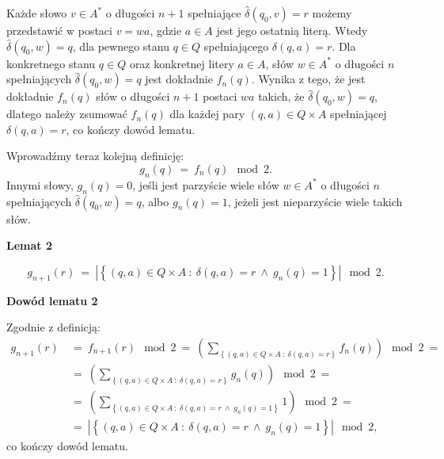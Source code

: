 \documentclass[12pt]{article}
\begin{document}
	Każde słowo \(v \in A^{\ast}\) o długości \(n + 1\) spełniające
	\(\hat{\delta} \left( q_0, v \right) = r\) możemy przedstawić w postaci \(v
	= wa\), gdzie \(a \in A\) jest jego ostatnią literą. Wtedy \(\hat{\delta}
	\left( q_0, w \right) = q\), dla pewnego stanu \(q \in Q\) spełniającego
	\(\delta (q, a) = r\). Dla konkretnego stanu \(q \in Q\) oraz konkretnej
	litery \(a \in A\), słów \(w \in A^{\ast}\) o długości \(n\) spełniających
	\(\hat{\delta} \left( q_0, w \right) = q\) jest dokładnie \(f_{n} (q)\).
	Wynika z tego, że jest dokładnie \(f_{n} (q)\) słów o długości \(n + 1\)
	postaci \(wa\) takich, że \(\hat{\delta} \left( q_0, w \right) = q\),
	dlatego należy zsumować \(f_{n} (q)\) dla każdej pary \((q, a) \in Q \times
	A\) spełniającej \(\delta (q, a) = r\), co kończy dowód lematu.
	
	\medskip
	
	Wprowadźmy teraz kolejną definicję:
	\[ g_{n} (q) \ = \ f_{n} (q) \mod 2 \text{.} \]
	Innymi słowy, \(g_{n} (q) = 0\), jeśli jest parzyście wiele słów \(w \in
	A^{\ast}\) o długości \(n\) spełniających \(\hat{\delta} \left( q_0, w
	\right) = q\), albo \(g_{n} (q) = 1\), jeżeli jest nieparzyście wiele takich
	słów.
	
	\medskip
	
	\textbf{Lemat 2}
	
	\[ g_{n + 1} (r) \ = \ \left| \left\{ (q, a) \in Q \times A \ : \ \delta (q,
	a) = r \ \wedge \ g_{n} (q) = 1 \right\} \right| \mod 2 \text{.} \]
	
	\newpage
	
	\textbf{Dowód lematu 2}
	
	\medskip
	
	Zgodnie z definicją:
	\begin{align*}
		g_{n + 1} (r) \ &= \ f_{n + 1} (r) \mod 2 \ = \ \left(
		\sum\limits_{\left\{ (q, a) \in Q \times A \ : \ \delta (q, a) = r
		\right\}} f_{n} (q) \right) \mod 2 \ = \\[0.2 cm]
		&= \ \left( \sum\limits_{\left\{ (q, a) \in Q \times A \ : \ \delta (q,
		a) = r \right\}} g_{n} (q) \right) \mod 2 \ = \\[0.2 cm]
		&=\ \left( \sum\limits_{\left\{ (q, a) \in Q \times A \ : \ \delta (q,
		a) = r \ \wedge \ g_{n} (q) = 1 \right\}} 1 \right) \mod 2 \ =
		\\[0.2 cm]
		&= \ \left| \left\{ (q, a) \in Q \times A \ : \ \delta (q, a) = r \
		\wedge \ g_{n} (q) = 1 \right\} \right| \mod 2 \text{,}
	\end{align*}
	co kończy dowód lematu.
	
\end{document}

